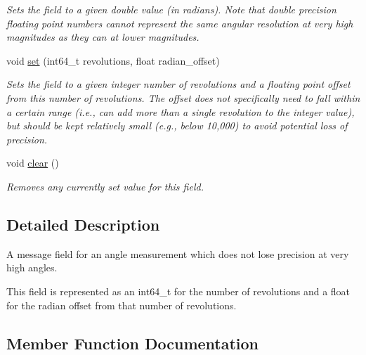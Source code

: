 \begin{DoxyCompactItemize}
\begin{DoxyCompactList}\small\item\em Sets the field to a given double value (in radians). Note that double precision floating point numbers cannot represent the same angular resolution at very high magnitudes as they can at lower magnitudes. \end{DoxyCompactList}\item 
void \hyperlink{classhebi_1_1Command_1_1HighResAngleField_ad70b3a6cb991a2096466fb04d3973429}{set} (int64\+\_\+t revolutions, float radian\+\_\+offset)\hypertarget{classhebi_1_1Command_1_1HighResAngleField_ad70b3a6cb991a2096466fb04d3973429}{}\label{classhebi_1_1Command_1_1HighResAngleField_ad70b3a6cb991a2096466fb04d3973429}

\begin{DoxyCompactList}\small\item\em Sets the field to a given integer number of revolutions and a floating point offset from this number of revolutions. The offset does not specifically need to fall within a certain range (i.\+e., can add more than a single revolution to the integer value), but should be kept relatively small (e.\+g., below 10,000) to avoid potential loss of precision. \end{DoxyCompactList}\item 
void \hyperlink{classhebi_1_1Command_1_1HighResAngleField_a2a7485482fbf0311d992c0db4036d5c1}{clear} ()\hypertarget{classhebi_1_1Command_1_1HighResAngleField_a2a7485482fbf0311d992c0db4036d5c1}{}\label{classhebi_1_1Command_1_1HighResAngleField_a2a7485482fbf0311d992c0db4036d5c1}

\begin{DoxyCompactList}\small\item\em Removes any currently set value for this field. \end{DoxyCompactList}\end{DoxyCompactItemize}


\subsection{Detailed Description}
A message field for an angle measurement which does not lose precision at very high angles. 

This field is represented as an int64\+\_\+t for the number of revolutions and a float for the radian offset from that number of revolutions. 

\subsection{Member Function Documentation}
